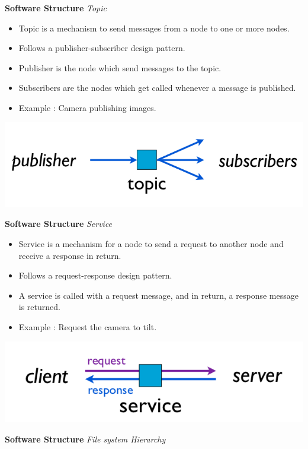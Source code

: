 \documentclass[a4paper, 10pt, conference]{ieeeconf}       %
\begin{document}
\textbf{Software Structure}
\textit{Topic}

\begin{itemize}
  \item Topic is a mechanism to send messages from a node to one or more nodes.
  \item Follows a publisher-subscriber design pattern.
  \item Publisher is the node which send messages to the topic.
  \item Subscribers are the nodes which get called whenever a message is published.
  \item Example : Camera publishing images.
\end{itemize}

\begin{center}
  \includegraphics[width=.6\textwidth]{topic}
\end{center}




\textbf{Software Structure}
\textit{Service}

\begin{itemize}
  \item Service is a mechanism for a node to send a request to another node and receive a response in return.
  \item Follows a request-response design pattern.
  \item A service is called with a request message, and in return, a response message is returned.
  \item Example : Request the camera to tilt.
\end{itemize}

\begin{center}
  \includegraphics[width=.6\textwidth]{service}
\end{center}



\textbf{Software Structure}
\textit{File system Hierarchy}
\end{document}
